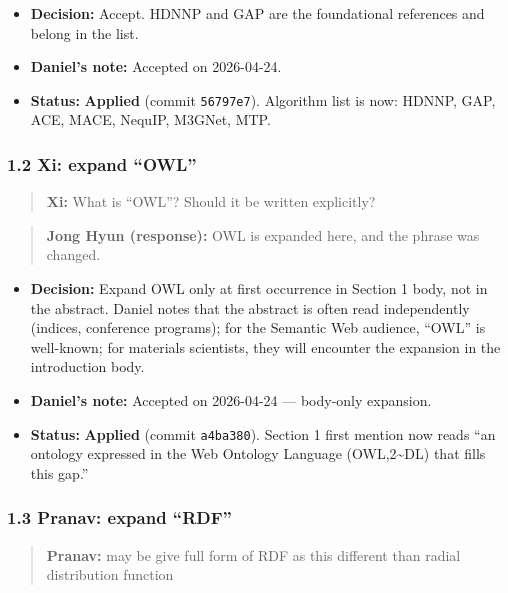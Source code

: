 \begin{itemize}
\tightlist
\item
  \textbf{Decision:} Accept. HDNNP and GAP are the foundational references and belong in the list.
\item
  \textbf{Daniel's note:} Accepted on 2026-04-24.
\item
  \textbf{Status:} {\color{green!60!black}\faCheckCircle} \textbf{Applied} (commit \texttt{56797e7}). Algorithm list is now: HDNNP, GAP, ACE, MACE, NequIP, M3GNet, MTP.
\end{itemize}

\subsubsection{1.2 Xi: expand ``OWL''}\label{xi-expand-owl}

\begin{quote}
\textbf{Xi:} What is ``OWL''? Should it be written explicitly?
\end{quote}

\begin{quote}
\textbf{Jong Hyun (response):} OWL is expanded here, and the phrase was changed.
\end{quote}

\begin{itemize}
\tightlist
\item
  \textbf{Decision:} Expand OWL only at first occurrence in Section 1 body, not in the abstract. Daniel notes that the abstract is often read independently (indices, conference programs); for the Semantic Web audience, ``OWL'' is well-known; for materials scientists, they will encounter the expansion in the introduction body.
\item
  \textbf{Daniel's note:} Accepted on 2026-04-24 --- body-only expansion.
\item
  \textbf{Status:} {\color{green!60!black}\faCheckCircle} \textbf{Applied} (commit \texttt{a4ba380}). Section 1 first mention now reads ``an ontology expressed in the Web Ontology Language (OWL,2\textasciitilde DL) that fills this gap.''
\end{itemize}

\subsubsection{1.3 Pranav: expand ``RDF''}\label{pranav-expand-rdf}

\begin{quote}
\textbf{Pranav:} may be give full form of RDF as this different than radial distribution function
\end{quote}

